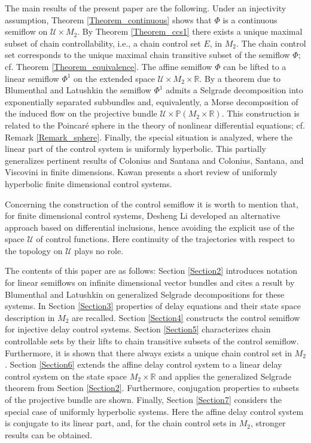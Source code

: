 \documentclass{siamltex}%
\begin{document}
The main results of the present paper are the following. Under an injectivity
assumption, Theorem \ref{Theorem_continuous} shows that $\Phi$ is a continuous
semiflow on $\mathcal{U}\times M_{2}$. By Theorem \ref{Theorem_ccs1} there
exists a unique maximal subset of chain controllability, i.e., a chain control
set $E$, in $M_{2}$. The chain control set corresponds to the unique maximal
chain transitive subset of the semiflow $\Phi$; cf. Theorem
\ref{Theorem_equivalence}. The affine semiflow $\Phi$ can be lifted to a
linear semiflow $\Phi^{1}$ on the extended space $\mathcal{U}\times
M_{2}\times\mathbb{R}$. By a theorem due to Blumenthal and Latushkin
\cite{BluL19} the semiflow $\Phi^{1}$ admits a Selgrade decomposition into
exponentially separated subbundles and, equivalently, a Morse decomposition of
the induced flow on the projective bundle $\mathcal{U}\times\mathbb{P}%
(M_{2}\times\mathbb{R})$. This construction is related to the Poincar\'{e}
sphere in the theory of nonlinear differential equations; cf. Remark
\ref{Remark_sphere}. Finally, the special situation is analyzed, where the
linear part of the control system is uniformly hyperbolic. This partially
generalizes pertinent results of Colonius and Santana \cite{ColS24} and
Colonius, Santana, and Viscovini \cite{ColSanV23} in finite dimensions. Kawan
\cite{Kawan17} presents a short review of uniformly hyperbolic finite
dimensional control systems.

Concerning the construction of the control semiflow it is worth to mention
that, for finite dimensional control systems, Desheng Li \cite{Li07} developed
an alternative approach based on differential inclusions, hence avoiding the
explicit use of the space $\mathcal{U}$ of control functions. Here continuity
of the trajectories with respect to the topology on $\mathcal{U}$ plays no role.

The contents of this paper are as follows: Section \ref{Section2} introduces
notation for linear semiflows on infinite dimensional vector bundles and cites
a result by Blumenthal and Latushkin on generalized Selgrade decompositions
for these systems. In Section \ref{Section3} properties of delay equations and
their state space description in $M_{2}$ are recalled. Section \ref{Section4}
constructs the control semiflow for injective delay control systems. Section
\ref{Section5} characterizes chain controllable sets by their lifts to chain
transitive subsets of the control semiflow. Furthermore, it is shown that
there always exists a unique chain control set in $M_{2}$. Section
\ref{Section6} extends the affine delay control system to a linear delay
control system on the state space $M_{2}\times\mathbb{R}$ and applies the
generalized Selgrade theorem from Section \ref{Section2}. Furthermore,
conjugation properties to subsets of the projective bundle are shown. Finally,
Section \ref{Section7} considers the special case of uniformly hyperbolic
systems. Here the affine delay control system is conjugate to its linear part,
and, for the chain control sets in $M_{2}$, stronger results can be
obtained.\medskip
\end{document}
